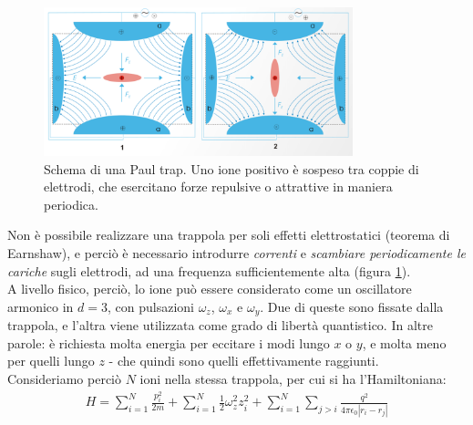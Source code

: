 \documentclass[../../InformazioneQuantistica.tex]{subfiles}
\begin{document}
\begin{figure}[H]
\centering
\includegraphics[width=0.8\textwidth]{Immagini/12_6/paul_trap.PNG}
\caption{Schema di una Paul trap. Uno ione positivo è sospeso tra coppie di elettrodi, che esercitano forze repulsive o attrattive in maniera periodica.\label{fig:Paul-trap}}
\end{figure}

Non è possibile realizzare una trappola per soli effetti elettrostatici (teorema di Earnshaw), e perciò è necessario introdurre \textit{correnti} e \textit{scambiare periodicamente le cariche} sugli elettrodi, ad una frequenza sufficientemente alta (figura \ref{fig:Paul-trap}).\\
A livello fisico, perciò, lo ione può essere considerato come un oscillatore armonico in $d=3$, con pulsazioni $\omega_z$, $\omega_x$ e $\omega_y$. Due di queste sono fissate  dalla trappola, e l'altra viene utilizzata come grado di libertà quantistico. In altre parole: è richiesta molta energia per eccitare i modi lungo $x$ o $y$, e molta meno per quelli lungo $z$ - che quindi sono quelli effettivamente raggiunti.\\

Consideriamo perciò $N$ ioni nella stessa trappola, per cui si ha l'Hamiltoniana:
\begin{align*}
H = \sum_{i=1}^N \frac{p_i^2}{2m} + \sum_{i=1}^N \frac{1}{2}\omega_z^2 z_i^2 + \sum_{i=1}^N \sum_{j>i} \frac{q^2}{4\pi\epsilon_0|r_i-r_j|}
\end{align*}
\end{document}
